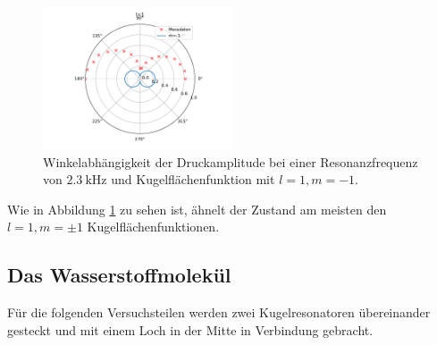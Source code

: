 \begin{figure}
    \centering
    \includegraphics[width=0.5\textwidth]{figure/9mmZwischenring_m-1.pdf}
    \caption{Winkelabhängigkeit der Druckamplitude bei einer Resonanzfrequenz von $\SI{2.3}{\kilo\hertz}$ und Kugelflächenfunktion mit $l=1,m=-1$.}
    \label{fig:9mmZwischenring_n2}
\end{figure}
\FloatBarrier
Wie in Abbildung \ref{fig:9mmZwischenring_n2} zu sehen ist, ähnelt der Zustand am meisten den $l=1,m=\pm 1$ Kugelflächenfunktionen.

\subsection{Das Wasserstoffmolekül}
Für die folgenden Versuchsteilen werden zwei Kugelresonatoren übereinander gesteckt und mit einem Loch in der Mitte in Verbindung gebracht.

